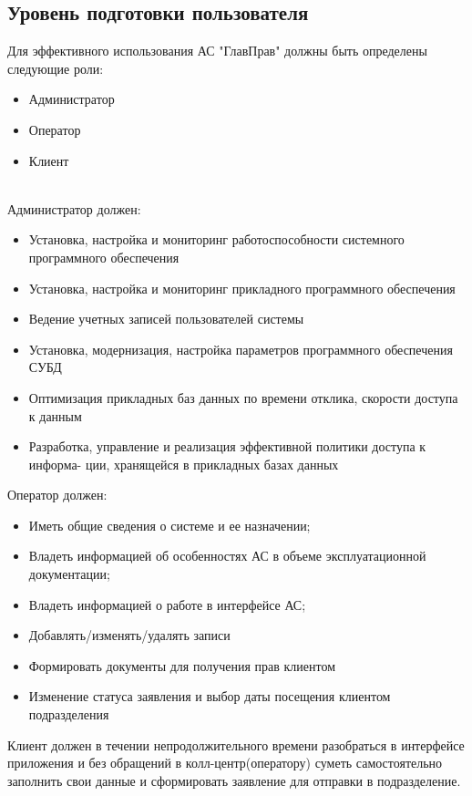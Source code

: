 \documentclass[russian, utf8, 12pt,pointsubsection,floatsubsection]{eskdtext}
\begin{document}
\subsection{Уровень подготовки пользователя}
Для эффективного использования АС "ГлавПрав" должны быть определены следующие роли:
\begin{itemize}
    \item Администратор
    \item Оператор
    \item Клиент 
\end{itemize} \\

Администратор должен:
\begin{itemize}
\item Установка, настройка и мониторинг работоспособности системного программного
обеспечения
\item Установка, настройка и мониторинг прикладного программного обеспечения
\item Ведение учетных записей пользователей системы
\item Установка, модернизация, настройка параметров программного обеспечения СУБД
\item Оптимизация прикладных баз данных по времени отклика, скорости доступа к данным
\item Разработка, управление и реализация эффективной политики доступа к информа-
ции, хранящейся в прикладных базах данных
\end{itemize}
\hfill \break

Оператор должен:
\begin{itemize}
\item Иметь общие сведения о системе и ее назначении;
\item Владеть информацией об особенностях АС в объеме эксплуатационной документации;
\item Владеть информацией о работе в интерфейсе АС;
\item Добавлять/изменять/удалять записи 
\item Формировать документы для получения прав клиентом
\item Изменение статуса заявления и выбор даты посещения клиентом подразделения

\end{itemize}
\hfill \break


Клиент должен в течении непродолжительного времени разобраться в интерфейсе приложения и без обращений в колл-центр(оператору) суметь самостоятельно заполнить свои данные и сформировать заявление для отправки в подразделение.
\newline
\end{document}
